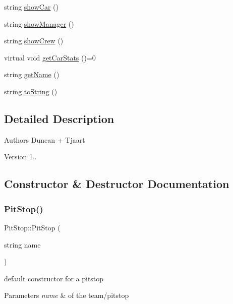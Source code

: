 \begin{DoxyCompactItemize}
string \mbox{\hyperlink{class_pit_stop_a50c9b32c4422d643fd8fdb901bad617a}{show\+Car}} ()
\item 
string \mbox{\hyperlink{class_pit_stop_a086c61b9f39bd212d33f569c76ac554e}{show\+Manager}} ()
\item 
string \mbox{\hyperlink{class_pit_stop_ad7f59968f9f74c427597bc4f80137f8b}{show\+Crew}} ()
\item 
virtual void \mbox{\hyperlink{class_pit_stop_a3a1040306ad9a9e573f488dd2dfc319f}{get\+Car\+Stats}} ()=0
\item 
string \mbox{\hyperlink{class_pit_stop_a84ba8d88f9995a144e65f5528d1f64ff}{get\+Name}} ()
\item 
string \mbox{\hyperlink{class_pit_stop_a3dcfcb1435c346df2265828a71f96601}{to\+String}} ()
\end{DoxyCompactItemize}


\subsection{Detailed Description}
\begin{DoxyAuthor}{Authors}
Duncan + Tjaart 
\end{DoxyAuthor}
\begin{DoxyVersion}{Version}
1.. 
\end{DoxyVersion}


\subsection{Constructor \& Destructor Documentation}
\mbox{\label{class_pit_stop_a6c071cb7cd700bd6cb87888fadd39086}} 
\subsubsection{\texorpdfstring{Pit\+Stop()}{PitStop()}}
{\footnotesize\ttfamily Pit\+Stop\+::\+Pit\+Stop (\begin{DoxyParamCaption}\item[{string}]{name }\end{DoxyParamCaption})}

default constructor for a pitstop 
\begin{DoxyParams}{Parameters}
{\em name} & of the team/pitstop \\
\hline
\end{DoxyParams}
\mbox{\label{class_pit_stop_a1315c3c8d71a3ea070ab2e05a2ff5d16}} 
